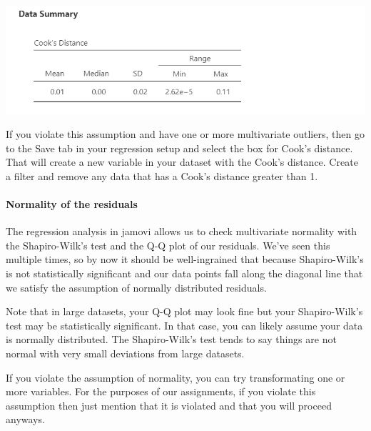 \documentclass[
]{book}
\begin{document}
\includegraphics{images/13-regression/regression-cooks.png}

If you violate this assumption and have one or more multivariate outliers, then go to the Save tab in your regression setup and select the box for Cook's distance. That will create a new variable in your dataset with the Cook's distance. Create a filter and remove any data that has a Cook's distance greater than 1.

\hypertarget{normality-of-the-residuals}{%
\paragraph{Normality of the residuals}\label{normality-of-the-residuals}}

The regression analysis in jamovi allows us to check multivariate normality with the Shapiro-Wilk's test and the Q-Q plot of our residuals. We've seen this multiple times, so by now it should be well-ingrained that because Shapiro-Wilk's is not statistically significant and our data points fall along the diagonal line that we satisfy the assumption of normally distributed residuals.

Note that in large datasets, your Q-Q plot may look fine but your Shapiro-Wilk's test may be statistically significant. In that case, you can likely assume your data is normally distributed. The Shapiro-Wilk's test tends to say things are not normal with very small deviations from large datasets.

If you violate the assumption of normality, you can try transformating one or more variables. For the purposes of our assignments, if you violate this assumption then just mention that it is violated and that you will proceed anyways.
\end{document}
